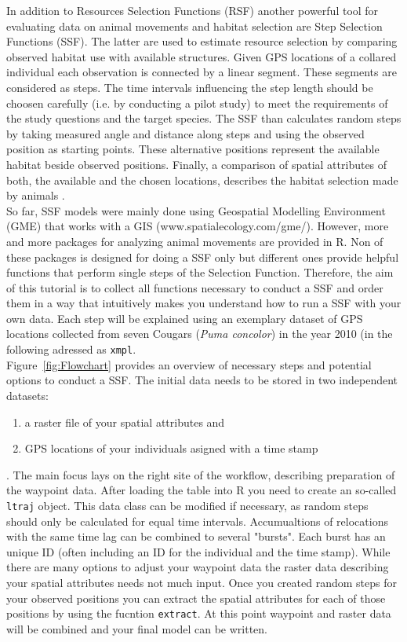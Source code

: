 \documentclass[11pt, a4paper]{article}\usepackage[]{graphicx}\usepackage[]{color}
\begin{document}
In addition to Resources Selection Functions (RSF) another powerful tool for evaluating data on animal movements and habitat selection are Step Selection Functions (SSF). The latter are used to estimate resource selection by comparing observed habitat use with available structures. Given GPS locations of a collared individual each observation is connected by a linear segment. These segments are considered as steps. The time intervals influencing the step length should be choosen carefully (i.e. by conducting a pilot study) to meet the requirements of the study questions and the target species. The SSF than calculates random steps by taking measured angle and distance along steps and using the observed position as starting points. These alternative positions represent the available habitat beside observed positions. Finally, a comparison of spatial attributes of both, the available and the chosen locations, describes the habitat selection made by animals \cite{thurfjell2014applications}.\\
So far, SSF models were mainly done using Geospatial Modelling Environment (GME) that works with a GIS (www.spatialecology.com/gme/). However, more and more packages for analyzing animal movements are provided in R. Non of these packages is designed for doing a SSF only but different ones provide helpful functions that perform single steps of the Selection Function. Therefore, the aim of this tutorial is to collect all functions necessary to conduct a SSF and order them in a  way that intuitively makes you understand how to run a SSF with your own data. Each step will be explained using an exemplary dataset of GPS locations collected from seven Cougars (\textit{Puma concolor}) in the year 2010 (in the following adressed as \texttt{xmpl}.\\


Figure~\ref{fig:Flowchart} provides an overview of necessary steps and potential options to conduct a SSF. The initial data needs to be stored in two independent datasets: \begin{enumerate} \item {a raster file of your spatial attributes} and \item{GPS locations of your individuals asigned with a time stamp} \end{enumerate}. The main focus lays on the right site of the workflow, describing preparation of the waypoint data. After loading the table into R you need to create an so-called \texttt{ltraj} object. This data class can be modified if necessary, as random steps should only be calculated for equal time intervals. Accumualtions of relocations with the same time lag can be combined to several "bursts". Each burst has an unique ID (often including an ID for the individual and the time stamp). While there are many options to adjust your waypoint data the raster data describing your spatial attributes needs not much input. Once you created random steps for your observed positions you can extract the spatial attributes for each of those positions by using the fucntion \texttt{extract}. At this point waypoint and raster data will be combined and your final model can be written.   
\end{document}
